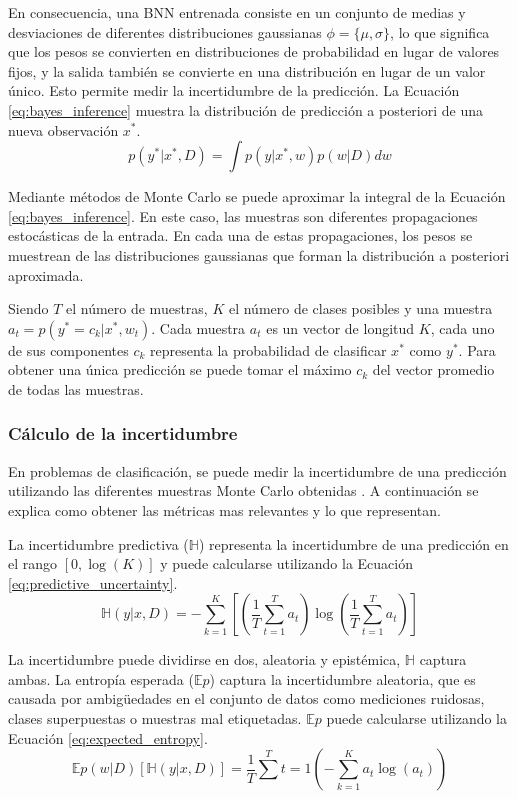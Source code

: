 En consecuencia, una BNN entrenada consiste en un conjunto de medias y desviaciones de diferentes distribuciones gaussianas $\phi = \{\mu, \sigma\}$, lo que significa que los pesos se convierten en distribuciones de probabilidad en lugar de valores fijos, y la salida también se convierte en una distribución en lugar de un valor único. Esto permite medir la incertidumbre de la predicción. La Ecuación \ref{eq:bayes_inference} muestra la distribución de predicción a posteriori de una nueva observación $x^*$.
\begin{equation} \label{eq:bayes_inference}
p(y^*|x^*,D) = \int p(y|x^*,w) p(w|D) dw
\end{equation}

Mediante métodos de Monte Carlo se puede aproximar la integral de la Ecuación \ref{eq:bayes_inference}. En este caso, las muestras son diferentes propagaciones estocásticas de la entrada. En cada una de estas propagaciones, los pesos se muestrean de las distribuciones gaussianas que forman la distribución a posteriori aproximada.

Siendo $T$ el número de muestras, $K$ el número de clases posibles y una muestra $a_t = p(y^* = c_k | x^*, w_t)$. Cada muestra $a_t$ es un vector de longitud $K$, cada uno de sus componentes $c_k$ representa la probabilidad de clasificar $x^*$ como $y^*$. Para obtener una única predicción se puede tomar el máximo $c_k$ del vector promedio de todas las muestras.

\subsubsection{Cálculo de la incertidumbre}

En problemas de clasificación, se puede medir la incertidumbre de una predicción utilizando las diferentes muestras Monte Carlo obtenidas \cite{uncertainty_metrics}. A continuación se explica como obtener las métricas mas relevantes y lo que representan.

La incertidumbre predictiva ($\mathbb{H}$) representa la incertidumbre de una predicción en el rango $[0, \log(K)]$ y puede calcularse utilizando la Ecuación \ref{eq:predictive_uncertainty}.
\begin{equation} \label{eq:predictive_uncertainty}
\mathbb{H}(y|x,D) = - \sum^K_{k=1} \left[ \left( \dfrac{1}{T} \sum^T_{t=1} a_t \right) \log\left( \dfrac{1}{T} \sum^T_{t=1} a_t \right) \right]
\end{equation}

La incertidumbre puede dividirse en dos, aleatoria y epistémica, $\mathbb{H}$ captura ambas. La entropía esperada ($\mathbb{E}p$) captura la incertidumbre aleatoria, que es causada por ambigüedades en el conjunto de datos como mediciones ruidosas, clases superpuestas o muestras mal etiquetadas. $\mathbb{E}p$ puede calcularse utilizando la Ecuación \ref{eq:expected_entropy}.
\begin{equation} \label{eq:expected_entropy}
\mathbb{E}{p(w|D)}[\mathbb{H}(y|x,D)] = \dfrac{1}{T} \sum^T{t=1} \left( -\sum^K_{k=1} a_{t} \log(a_t) \right)
\end{equation}

